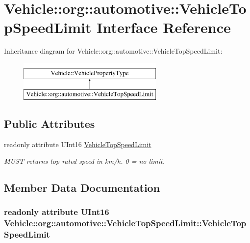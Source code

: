 \hypertarget{interfaceVehicle_1_1org_1_1automotive_1_1VehicleTopSpeedLimit}{\section{Vehicle\-:\-:org\-:\-:automotive\-:\-:Vehicle\-Top\-Speed\-Limit Interface Reference}
\label{interfaceVehicle_1_1org_1_1automotive_1_1VehicleTopSpeedLimit}
}
Inheritance diagram for Vehicle\-:\-:org\-:\-:automotive\-:\-:Vehicle\-Top\-Speed\-Limit\-:\begin{figure}[H]
\begin{center}
\leavevmode
\includegraphics[height=2.000000cm]{interfaceVehicle_1_1org_1_1automotive_1_1VehicleTopSpeedLimit}
\end{center}
\end{figure}
\subsection*{Public Attributes}
\begin{DoxyCompactItemize}
\item 
readonly attribute U\-Int16 \hyperlink{interfaceVehicle_1_1org_1_1automotive_1_1VehicleTopSpeedLimit_a41fd97aa9ba114419e5a5647f05e0f1b}{Vehicle\-Top\-Speed\-Limit}
\begin{DoxyCompactList}\small\item\em M\-U\-S\-T returns top rated speed in km/h. 0 = no limit. \end{DoxyCompactList}\end{DoxyCompactItemize}


\subsection{Member Data Documentation}
\hypertarget{interfaceVehicle_1_1org_1_1automotive_1_1VehicleTopSpeedLimit_a41fd97aa9ba114419e5a5647f05e0f1b}{
\subsubsection[{Vehicle\-Top\-Speed\-Limit}]{\setlength{\rightskip}{0pt plus 5cm}readonly attribute U\-Int16 Vehicle\-::org\-::automotive\-::\-Vehicle\-Top\-Speed\-Limit\-::\-Vehicle\-Top\-Speed\-Limit}}\label{interfaceVehicle_1_1org_1_1automotive_1_1VehicleTopSpeedLimit_a41fd97aa9ba114419e5a5647f05e0f1b}



